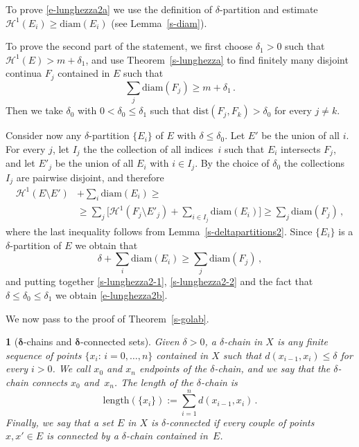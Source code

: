 \documentclass[11pt,reqno,a4paper,final]{amsart}
\makeatletter
\numberwithin{equation}{section}
\theoremstyle{mytheorem}
\theoremstyle{myremark}
\theoremstyle{myparagraph}
\newtheorem{parag}[subsection]{}
\renewenvironment{proof}[1][\proofname]{\par 
  \pushQED{\qed}%
  \normalfont \topsep10\p@\@plus6\p@\relax 
  \trivlist 
  \item[\hskip\labelsep 
    \bfseries 
    #1\@addpunct{.}]\ignorespaces 
}{%
  \popQED\endtrivlist\@endpefalse 
}
\providecommand{\proofname}{Proof}
\newcommand{\Haus}{\mathscr{H}}
\newcommand{\Len}{\mathrm{length}}
\newcommand{\diam}{\mathrm{diam}}
\newcommand{\dist}{\mathrm{dist}}
\makeatother
\begin{document}
\begin{proof}[Proof of Proposition~\ref{s-lunghezza2}]
To prove \eqref{e-lunghezza2a} we use
the definition of $\delta$-partition and estimate 
$\Haus^1(E_i)\ge \diam(E_i)$ (see Lemma~\ref{s-diam}).

To prove the second part of the statement,
we first choose $\delta_1>0$ such that $\Haus^1(E) > m+\delta_1$, 
and use Theorem~\ref{s-lunghezza} to find finitely many 
disjoint continua $F_j$ contained in $E$ such that 
%
\begin{equation}
\label{s-lunghezza2-1}
\sum_j \diam(F_j) \ge m+\delta_1
\, .
\end{equation}
%
Then we take $\delta_0$ with $0<\delta_0\le\delta_1$
such that $\dist(F_j,F_k)>\delta_0$ for every $j\ne k$.

Consider now any $\delta$-partition $\{E_i\}$
of $E$ with $\delta\le\delta_0$. 
Let $E'$ be the union of all $i$.
For every $j$, let $I_j$ the the collection 
of all indices~$i$ such that $E_i$ intersects $F_j$, 
and let $E'_j$ be the union of all $E_i$ with $i\in I_j$. 
By the choice of $\delta_0$
the collections $I_j$ are pairwise disjoint, and therefore
%
\begin{align*}
  \Haus^1(E\setminus E') 
& + \sum_i \diam(E_i) \ge {} \\ 
& \ge \sum_j \bigg[ \Haus^1(F_j\setminus E'_j) 
                    + \sum_{i\in I_j} \diam(E_i) \bigg]
  \ge \sum_j \diam(F_j)
\, ,
\end{align*}
%
where the last inequality follows from 
Lemma~\ref{s-deltapartitions2}.
Since $\{E_i\}$ is a $\delta$-partition of $E$ 
we obtain that
%
\begin{equation}
\label{s-lunghezza2-2}
\delta + \sum_i \diam(E_i) \ge \sum_j \diam(F_j)
\, ,
\end{equation}
%
and putting together \eqref{s-lunghezza2-1}, \eqref{s-lunghezza2-2}
and the fact that $\delta\le\delta_0\le\delta_1$ 
we obtain \eqref{e-lunghezza2b}.
\end{proof}



We now pass to the proof of Theorem~\ref{s-golab}.


\begin{parag}[$\boldsymbol\delta$-chains 
and $\boldsymbol\delta$-connected sets]
\label{s-deltachain}
Given $\delta>0$, a \emph{$\delta$-chain} in $X$ is any finite 
sequence of points $\{x_i: \, i=0,\dots,n\}$ contained in $X$
such that $d(x_{i-1}, x_i)\le\delta$ for every $i>0$. 
We call $x_0$ and $x_n$ \emph{endpoints} of the $\delta$-chain, 
and we say that the $\delta$-chain connects $x_0$ and~$x_n$.
The \emph{length} of the $\delta$-chain is 
\[
\Len(\{x_i\}) 
:= \sum_{i=1}^n d(x_{i-1}, x_i)
\, .
\]
Finally, we say that a set $E$ in $X$ is $\delta$-connected 
if every couple of points $x,x'\in E$ is connected by 
a $\delta$-chain contained in~$E$.
\end{parag}
\end{document}
